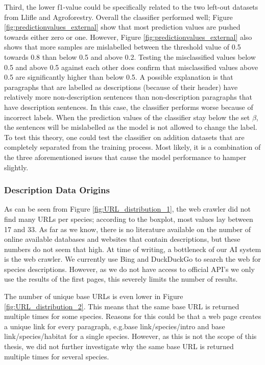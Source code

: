 \documentclass[a4paper, 12pt, oneside]{book} %
\begin{document}
Third, the lower f1-value could be specifically related to the two left-out datasets from Llifle and Agroforestry.
Overall the classifier performed well; Figure \ref{fig:predictionvalues_external} show that most prediction values are pushed towards either zero or one.
However, Figure \ref{fig:predictionvalues_external} also shows that more samples are mislabelled between the threshold value of 0.5 towards 0.8 than below 0.5 and above 0.2.
Testing the misclassified values below 0.5 and above 0.5 against each other does confirm that misclassified values above 0.5 are significantly higher than below 0.5.
A possible explanation is that paragraphs that are labelled as descriptions (because of their header) have relatively more non-description sentences than non-description paragraphs that have description sentences.
In this case, the classifier performs worse because of incorrect labels.
When the prediction values of the classifier stay below the set \(\beta\), the sentences will be mislabelled as the model is not allowed to change the label.
To test this theory, one could test the classifier on addition datasets that are completely separated from the training process.
Most likely, it is a combination of the three aforementioned issues that cause the model performance to hamper slightly.


\subsubsection{Description Data Origins}
As can be seen from Figure \ref{fig:URL_distribution_1}, the web crawler did not find many URLs per species; according to the boxplot, most values lay between 17 and 33.
As far as we know, there is no literature available on the number of online available databases and websites that contain descriptions, but these numbers do not seem that high.
At time of writing, a bottleneck of our AI system is the web crawler.
We currently use Bing and DuckDuckGo to search the web for species descriptions.
However, as we do not have access to official API's we only use the results of the first pages, this severely limits the number of results.


The number of unique base URLs is even lower in Figure \ref{fig:URL_distribution_2}.
This means that the same base URL is returned multiple times for some species. 
Reasons for this could be that a web page creates a unique link for every paragraph, e.g.base link/species/intro and base link/species/habitat for a single species.
However, as this is not the scope of this thesis, we did not further investigate why the same base URL is returned multiple times for several species.
\end{document}
